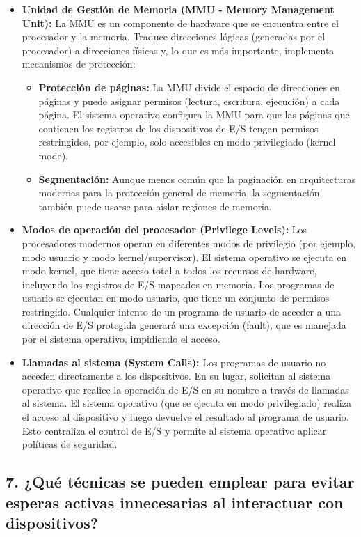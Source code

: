 \documentclass[12pt]{article}
\begin{document}
\begin{itemize}
    \item \textbf{Unidad de Gestión de Memoria (MMU - Memory Management Unit):} La MMU es un componente de hardware que se encuentra entre el procesador y la memoria. Traduce direcciones lógicas (generadas por el procesador) a direcciones físicas y, lo que es más importante, implementa mecanismos de protección:
    \begin{itemize}
        \item \textbf{Protección de páginas:} La MMU divide el espacio de direcciones en páginas y puede asignar permisos (lectura, escritura, ejecución) a cada página. El sistema operativo configura la MMU para que las páginas que contienen los registros de los dispositivos de E/S tengan permisos restringidos, por ejemplo, solo accesibles en modo privilegiado (kernel mode).
        \item \textbf{Segmentación:} Aunque menos común que la paginación en arquitecturas modernas para la protección general de memoria, la segmentación también puede usarse para aislar regiones de memoria.
    \end{itemize}
    \item \textbf{Modos de operación del procesador (Privilege Levels):} Los procesadores modernos operan en diferentes modos de privilegio (por ejemplo, modo usuario y modo kernel/supervisor). El sistema operativo se ejecuta en modo kernel, que tiene acceso total a todos los recursos de hardware, incluyendo los registros de E/S mapeados en memoria. Los programas de usuario se ejecutan en modo usuario, que tiene un conjunto de permisos restringido. Cualquier intento de un programa de usuario de acceder a una dirección de E/S protegida generará una excepción (fault), que es manejada por el sistema operativo, impidiendo el acceso.
    \item \textbf{Llamadas al sistema (System Calls):} Los programas de usuario no acceden directamente a los dispositivos. En su lugar, solicitan al sistema operativo que realice la operación de E/S en su nombre a través de llamadas al sistema. El sistema operativo (que se ejecuta en modo privilegiado) realiza el acceso al dispositivo y luego devuelve el resultado al programa de usuario. Esto centraliza el control de E/S y permite al sistema operativo aplicar políticas de seguridad.
\end{itemize}

\subsection*{7. ¿Qué técnicas se pueden emplear para evitar esperas activas innecesarias al interactuar con dispositivos?}
\end{document}
